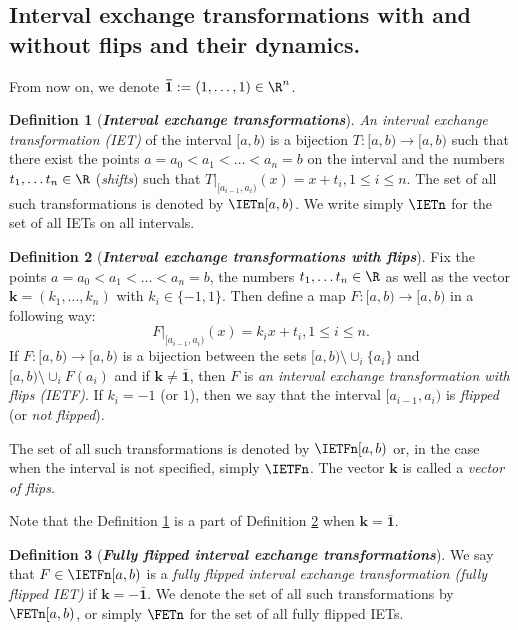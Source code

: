 \documentclass[12pt]{article}
\theoremstyle{definition}
\newtheorem{definition}{Definition}
\begin{document}
\subsection{Interval exchange transformations with and without flips and their dynamics.}\label{subs:IETS_with_without}
From now on, we denote $\boldsymbol{\bar{1}}:=(1, \ldots, 1) \in \R^n$.

\begin{definition}[\textbf{\emph{Interval exchange transformations}}]\label{def:IET}
\emph{An interval exchange transformation (IET)} of the interval $[a,b)$ is a bijection $T: [a,b) \rightarrow [a,b)$ such that there exist the points $a=a_0<a_1< \ldots < a_n=b$ on the interval and the numbers $t_1, \ldots t_n \in \R$ (\emph{shifts}) such that $\left.T\right|_{[a_{i-1},a_i)} (x) = x+t_i, 1 \leq i \leq n$. The set of all such transformations is denoted by $\IETn [a,b)$. We write simply $\IETn$ for the set of all IETs on all intervals.
\end{definition}
\begin{definition}[\textbf{\emph{Interval exchange transformations with flips}}]\label{def:IETF}
Fix the points $a=a_0<a_1< \ldots < a_n=b$, the numbers $t_1, \ldots t_n \in \R$ as well as the vector $\textbf{k}=(k_1, \ldots , k_n)$ with $k_i \in \{-1,1\}$.
Then define a map  $F: [a,b) \rightarrow [a,b)$ in a following way: 
\begin{equation*}
\left.F\right|_{[a_{i-1},a_i)} (x) = k_i x+t_i, 1 \leq i \leq n.
\end{equation*}
If $F: [a,b) \rightarrow [a,b)$ is a bijection between the sets $[a,b) \setminus \cup_i \{a_i\}$ and $[a,b) \setminus \cup_i F(a_i)$ and if $\boldsymbol{k} \neq\boldsymbol{\bar{1}}$, then $F$ is \emph{an interval exchange transformation with flips (IETF)}. If $k_i=-1$ (or $1$), then we say that the interval $[a_{i-1},a_i)$ is \emph{flipped} (or \emph{not flipped}). 

The set of all such transformations is denoted by $\IETFn[a,b)$ or, in the case when the interval is not specified, simply $\IETFn$. The vector $\textbf{k}$ is called a \emph{vector of flips.}
\end{definition}







Note that the Definition \ref{def:IET} is a part of Definition \ref{def:IETF} when $\textbf{k} = \boldsymbol{\bar{1}}$.
\begin{definition}[\emph{\textbf{Fully flipped interval exchange transformations}}]\label{def:FETT}
We say that $F \in \IETFn[a,b)$ is a \emph{fully flipped interval exchange transformation (fully flipped IET)} if $\textbf{k}=- \boldsymbol{\bar{1}}.$ We denote the set of all such transformations by $\FETn[a,b)$, or simply $\FETn$ for the set of all fully flipped IETs.
\end{definition}
\end{document}
